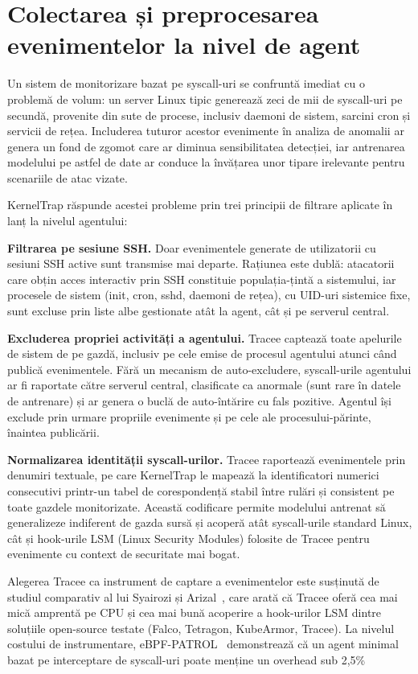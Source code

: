 \section{Colectarea și preprocesarea evenimentelor la nivel de agent}

Un sistem de monitorizare bazat pe syscall-uri se confruntă imediat cu o problemă de volum:
un server Linux tipic generează zeci de mii de syscall-uri pe secundă, provenite din sute de
procese, inclusiv daemoni de sistem, sarcini cron și servicii de rețea. Includerea tuturor
acestor evenimente în analiza de anomalii ar genera un fond de zgomot care ar diminua
sensibilitatea detecției, iar antrenarea modelului pe astfel de date ar conduce la învățarea
unor tipare irelevante pentru scenariile de atac vizate.

KernelTrap răspunde acestei probleme prin trei principii de filtrare aplicate în lanț la
nivelul agentului:

\textbf{Filtrarea pe sesiune SSH.} Doar evenimentele generate de utilizatorii cu sesiuni SSH
active sunt transmise mai departe. Rațiunea este dublă: atacatorii care obțin acces interactiv
prin SSH constituie populația-țintă a sistemului, iar procesele de sistem (init, cron, sshd,
daemoni de rețea), cu UID-uri sistemice fixe, sunt excluse prin liste albe gestionate atât la
agent, cât și pe serverul central.

\textbf{Excluderea propriei activități a agentului.} Tracee captează toate apelurile de sistem
de pe gazdă, inclusiv pe cele emise de procesul agentului atunci când publică evenimentele.
Fără un mecanism de auto-excludere, syscall-urile agentului ar fi raportate către serverul
central, clasificate ca anormale (sunt rare în datele de antrenare) și ar genera o buclă de
auto-întărire cu fals pozitive. Agentul își exclude prin urmare propriile evenimente și pe cele
ale procesului-părinte, înaintea publicării.

\textbf{Normalizarea identității syscall-urilor.} Tracee raportează evenimentele prin denumiri
textuale, pe care KernelTrap le mapează la identificatori numerici consecutivi printr-un tabel
de corespondență stabil între rulări și consistent pe toate gazdele monitorizate. Această
codificare permite modelului antrenat să generalizeze indiferent de gazda sursă și acoperă
atât syscall-urile standard Linux, cât și hook-urile LSM (Linux Security Modules) folosite de
Tracee pentru evenimente cu context de securitate mai bogat.

Alegerea Tracee ca instrument de captare a evenimentelor este susținută de studiul comparativ
al lui Syairozi și Arizal~\cite{syairozi2025ebpfcomparative}, care arată că Tracee oferă cea
mai mică amprentă pe CPU și cea mai bună acoperire a hook-urilor LSM dintre soluțiile
open-source testate (Falco, Tetragon, KubeArmor, Tracee). La nivelul costului de instrumentare,
eBPF-PATROL~\cite{ebpfpatrol2025} demonstrează că un agent minimal bazat pe interceptare de
syscall-uri poate menține un overhead sub 2,5\%

